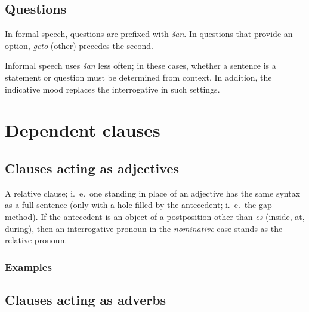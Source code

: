 \documentclass{book}
\begin{document}
\section{Questions}

In formal speech, questions are prefixed with \emph{šan}. In questions that provide an option, \emph{geto} (other) precedes the second.


Informal speech uses \emph{šan} less often; in these cases, whether a sentence is a statement or question must be determined from context. In addition, the indicative mood replaces the interrogative in such settings.

\chapter{Dependent clauses}

\section{Clauses acting as adjectives}

A relative clause; i.~e.~one standing in place of an adjective has the same syntax as a full sentence (only with a hole filled by the antecedent; i.~e.~the gap method). If the antecedent is an object of a postposition other than \emph{es} (inside, at, during), then an interrogative pronoun in the \emph{nominative} case stands as the relative pronoun.

\subsection{Examples}


\section{Clauses acting as adverbs}
\end{document}

